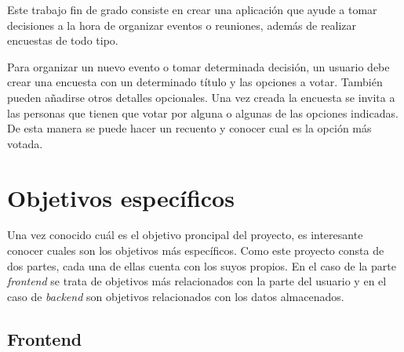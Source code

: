 \documentclass[a4paper, 12pt]{book}
\begin{document}
Este trabajo fin de grado consiste en crear una aplicaci\'on que ayude a tomar decisiones a la
hora de organizar eventos o reuniones, adem\'as de realizar encuestas de todo tipo.

Para organizar un nuevo evento o tomar determinada decisi\'on, un usuario debe crear una encuesta
con un determinado t\'itulo y las opciones a votar. Tambi\'en pueden a\~nadirse otros detalles opcionales. 
Una vez creada la encuesta se invita a las personas que tienen que votar por alguna o algunas
de las opciones indicadas. De esta manera se puede hacer un recuento y conocer cual es la opci\'on m\'as
votada.


\section{Objetivos espec\'ificos}
\label{sec:objetivos-especificos}

Una vez conocido cu\'al es el objetivo proncipal del proyecto, es interesante conocer cuales son los
objetivos m\'as espec\'ificos. Como este proyecto consta de dos partes, cada una de ellas cuenta
con los suyos propios. En el caso de la parte \emph{frontend} se trata de objetivos m\'as relacionados
con la parte del usuario y en el caso de \emph{backend} son objetivos relacionados con los datos
almacenados.

\subsection{Frontend}
\label{sec:objetivos-especificos}
\end{document}
